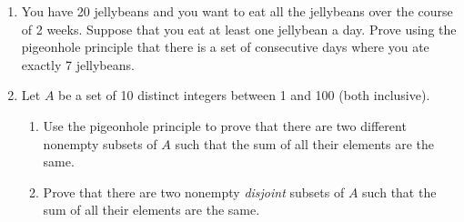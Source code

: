\documentclass{article}
\theoremstyle{definition}
\begin{document}
\begin{question}{10}
    \begin{enumerate}
	\item You have 20 jellybeans and you want to eat all the jellybeans over the course of 2 weeks. Suppose that you eat at least one jellybean a day. Prove using the pigeonhole principle that there is a set of consecutive days where you ate exactly 7 jellybeans. 
	\item Let \(A\) be a set of 10 distinct integers between 1 and 100 (both inclusive). 
 \begin{enumerate}
     \item Use the pigeonhole principle to prove that there are two different nonempty subsets of \(A\) such that the sum of all their elements are the same.
     \item Prove that there are two nonempty \emph{disjoint} subsets of \(A\) such that the sum of all their elements are the same.
 \end{enumerate}
	
    \end{enumerate}
\end{question}
\end{document}
